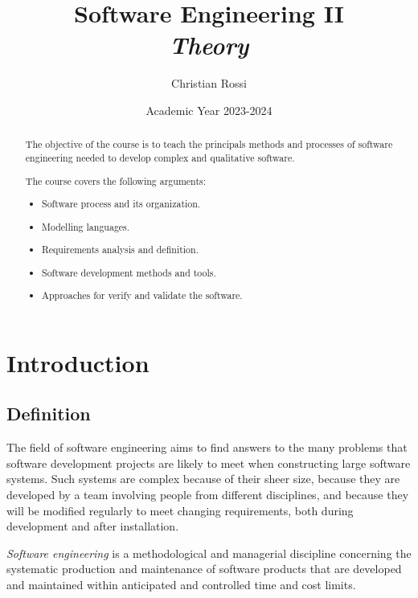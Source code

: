 \documentclass[12pt, a4paper]{report}
\title{Software Engineering II \\ \textit{Theory}}
\author{Christian Rossi}
\date{Academic Year 2023-2024}
\begin{document}
\maketitle

\newpage

\begin{abstract}
    The objective of the course is to teach the principals methods and processes of software engineering needed to develop complex and qualitative software.
     
    The course covers the following arguments:
    \begin{itemize}
        \item Software process and its organization.
        \item Modelling languages.
        \item Requirements analysis and definition.
        \item Software development methods and tools.
        \item Approaches for verify and validate the software.
    \end{itemize}
\end{abstract}

\newpage

\tableofcontents

\newpage

\chapter{Introduction}
    \section{Definition}
    The field of software engineering aims to find answers to the many problems that software development projects are likely
    to meet when constructing large software systems. Such systems are complex because of their sheer size, because they are 
    developed by a team involving people from different disciplines, and because they will be modified regularly to meet 
    changing requirements, both during development and after installation. 
    \begin{definition}
        \emph{Software engineering} is a methodological and managerial discipline concerning the systematic production and 
        maintenance of software products that are developed and maintained within anticipated and controlled time and cost limits.
    \end{definition}
    
\end{document}
